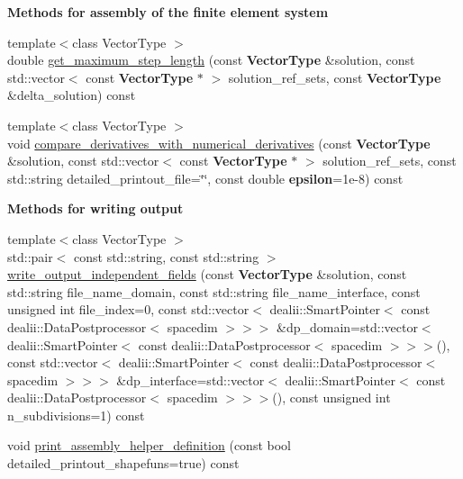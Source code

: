 \begin{Indent}{\bf Methods for assembly of the finite element system}
\begin{DoxyCompactItemize}
\item 
{\footnotesize template$<$class Vector\+Type $>$ }\\double \hyperlink{class_assembly_helper_aae924a79482fed55899a59052bd9103d}{get\+\_\+maximum\+\_\+step\+\_\+length} (const {\bf Vector\+Type} \&solution, const std\+::vector$<$ const {\bf Vector\+Type} $\ast$ $>$ solution\+\_\+ref\+\_\+sets, const {\bf Vector\+Type} \&delta\+\_\+solution) const 
\item 
{\footnotesize template$<$class Vector\+Type $>$ }\\void \hyperlink{class_assembly_helper_ac87490e0d3d84b11e2f7187f8706dab6}{compare\+\_\+derivatives\+\_\+with\+\_\+numerical\+\_\+derivatives} (const {\bf Vector\+Type} \&solution, const std\+::vector$<$ const {\bf Vector\+Type} $\ast$ $>$ solution\+\_\+ref\+\_\+sets, const std\+::string detailed\+\_\+printout\+\_\+file=\char`\"{}\char`\"{}, const double {\bf epsilon}=1e-\/8) const 
\end{DoxyCompactItemize}
\end{Indent}
\begin{Indent}{\bf Methods for writing output}\par
\begin{DoxyCompactItemize}
\item 
{\footnotesize template$<$class Vector\+Type $>$ }\\std\+::pair$<$ const std\+::string, const std\+::string $>$ \hyperlink{class_assembly_helper_a74187aa98464043ea6572c3ac345640e}{write\+\_\+output\+\_\+independent\+\_\+fields} (const {\bf Vector\+Type} \&solution, const std\+::string file\+\_\+name\+\_\+domain, const std\+::string file\+\_\+name\+\_\+interface, const unsigned int file\+\_\+index=0, const std\+::vector$<$ dealii\+::\+Smart\+Pointer$<$ const dealii\+::\+Data\+Postprocessor$<$ spacedim $>$$>$$>$ \&dp\+\_\+domain=std\+::vector$<$ dealii\+::\+Smart\+Pointer$<$ const dealii\+::\+Data\+Postprocessor$<$ spacedim $>$$>$$>$(), const std\+::vector$<$ dealii\+::\+Smart\+Pointer$<$ const dealii\+::\+Data\+Postprocessor$<$ spacedim $>$$>$$>$ \&dp\+\_\+interface=std\+::vector$<$ dealii\+::\+Smart\+Pointer$<$ const dealii\+::\+Data\+Postprocessor$<$ spacedim $>$$>$$>$(), const unsigned int n\+\_\+subdivisions=1) const 
\item 
void \hyperlink{class_assembly_helper_afd598b93397e6af53f0e4e274e6f880e}{print\+\_\+assembly\+\_\+helper\+\_\+definition} (const bool detailed\+\_\+printout\+\_\+shapefuns=true) const 
\end{DoxyCompactItemize}
\end{Indent}
